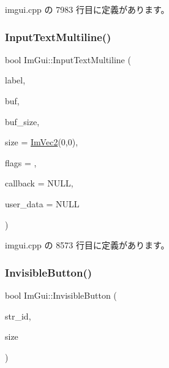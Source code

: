  imgui.\+cpp の 7983 行目に定義があります。

\mbox{\label{namespace_im_gui_a94b4d241eafa1a4a077f98f5aee00dda}} 
\subsubsection{\texorpdfstring{Input\+Text\+Multiline()}{InputTextMultiline()}}
{\footnotesize\ttfamily bool Im\+Gui\+::\+Input\+Text\+Multiline (\begin{DoxyParamCaption}\item[{const char $\ast$}]{label,  }\item[{char $\ast$}]{buf,  }\item[{size\+\_\+t}]{buf\+\_\+size,  }\item[{const \mbox{\hyperlink{struct_im_vec2}{Im\+Vec2}} \&}]{size = {\ttfamily \mbox{\hyperlink{struct_im_vec2}{Im\+Vec2}}(0,0)},  }\item[{\mbox{\hyperlink{imgui_8h_a7d2c6153a6b9b5d3178ce82434ac9fb8}{Im\+Gui\+Input\+Text\+Flags}}}]{flags = {},  }\item[{\mbox{\hyperlink{imgui_8h_ae9254e6ad76a9bc7abc20929e07b29c5}{Im\+Gui\+Text\+Edit\+Callback}}}]{callback = {\ttfamily NULL},  }\item[{void $\ast$}]{user\+\_\+data = {\ttfamily NULL} }\end{DoxyParamCaption})}



 imgui.\+cpp の 8573 行目に定義があります。

\mbox{\label{namespace_im_gui_a22668d440cbbb1f8be07241d9c6d9096}} 
\subsubsection{\texorpdfstring{Invisible\+Button()}{InvisibleButton()}}
{\footnotesize\ttfamily bool Im\+Gui\+::\+Invisible\+Button (\begin{DoxyParamCaption}\item[{const char $\ast$}]{str\+\_\+id,  }\item[{const \mbox{\hyperlink{struct_im_vec2}{Im\+Vec2}} \&}]{size }\end{DoxyParamCaption})}



